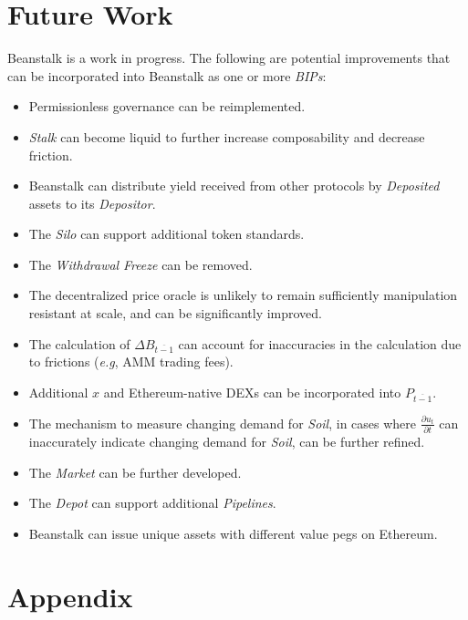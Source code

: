 \documentclass[tikz]{article}
\newcommand{\term}[1]{\textsl{#1}}
\begin{document}
\section{Future Work}
Beanstalk is a work in progress. The following are potential improvements that can be incorporated into Beanstalk as one or more \term{BIPs}:

\begin{itemize}
    \item Permissionless governance can be reimplemented.
    \item \term{Stalk} can become liquid to further increase composability and decrease friction. 
    \item Beanstalk can distribute yield received from other protocols by \term{Deposited} assets to its \term{Depositor}.
    \item The \term{Silo} can support additional token standards.
    \item The \term{Withdrawal} \term{Freeze} can be removed.
    \item The decentralized price oracle is unlikely to remain sufficiently manipulation resistant at scale, and can be significantly improved. 
    \item The calculation of \hyperlink{ht50}{$\Delta B_{\overline{t-1}}$} can account for inaccuracies in the calculation due to frictions (\term{e.g}, AMM trading fees).
    \item Additional \hyperlink{ht223}{$x$} and Ethereum-native DEXs can be incorporated into \hyperlink{ht139}{$P_{\overline{t-1}}$}.
    \item The mechanism to measure changing demand for \term{Soil}, in cases where \hyperlink{ht63}{$\frac{\partial u_t}{\partial t}$} can inaccurately indicate changing demand for \term{Soil}, can be further refined.
    \item The \term{Market} can be further developed.
    \item The \term{Depot} can support additional \term{Pipelines}.
    \item Beanstalk can issue unique assets with different value pegs on Ethereum.
\end{itemize}

\newpage
\section{Appendix}

\newpage
\end{document}
